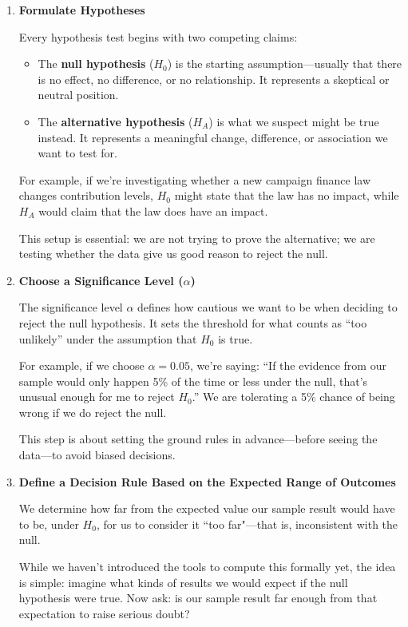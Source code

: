 \documentclass[12pt]{article}
\begin{document}
\begin{enumerate}
  \item \textbf{Formulate Hypotheses}

  Every hypothesis test begins with two competing claims:

  \begin{itemize}
    \item The \textbf{null hypothesis} ($H_0$) is the starting assumption—usually that there is no effect, no difference, or no relationship. It represents a skeptical or neutral position.
    \item The \textbf{alternative hypothesis} ($H_A$) is what we suspect might be true instead. It represents a meaningful change, difference, or association we want to test for.
  \end{itemize}

  For example, if we're investigating whether a new campaign finance law changes contribution levels, $H_0$ might state that the law has no impact, while $H_A$ would claim that the law does have an impact.

  This setup is essential: we are not trying to prove the alternative; we are testing whether the data give us good reason to reject the null.

  \item \textbf{Choose a Significance Level ($\alpha$)}

  The significance level $\alpha$ defines how cautious we want to be when deciding to reject the null hypothesis. It sets the threshold for what counts as “too unlikely” under the assumption that $H_0$ is true.

  For example, if we choose $\alpha = 0.05$, we're saying: “If the evidence from our sample would only happen 5\% of the time or less under the null, that’s unusual enough for me to reject $H_0$.” We are tolerating a 5\% chance of being wrong if we do reject the null.

  This step is about setting the ground rules in advance—before seeing the data—to avoid biased decisions.

  \item \textbf{Define a Decision Rule Based on the Expected Range of Outcomes}

  We determine how far from the expected value our sample result would have to be, under $H_0$, for us to consider it ``too far"—that is, inconsistent with the null.

  While we haven't introduced the tools to compute this formally yet, the idea is simple: imagine what kinds of results we would expect if the null hypothesis were true. Now ask: is our sample result far enough from that expectation to raise serious doubt?


\end{enumerate}
\end{document}
